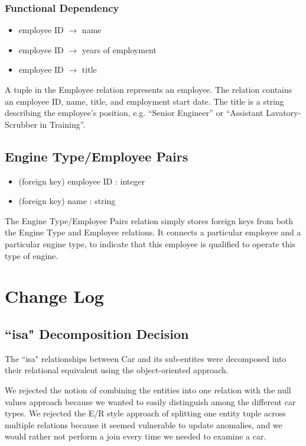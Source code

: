 \documentclass[a4paper]{article}
\begin{document}
\subsubsection*{Functional Dependency}
\begin{itemize}
\item employee ID  $\rightarrow$ name
\item employee ID  $\rightarrow$ years of employment
\item employee ID  $\rightarrow$ title
\end{itemize}
A tuple in the Employee relation represents an employee. The relation contains an employee ID, name, title, and employment start date. The title is a string describing the employee’s position, e.g. “Senior Engineer” or “Assistant Lavatory-Scrubber in Training”.

\subsection*{Engine Type/Employee Pairs}
\begin{itemize}
\item (foreign key) employee ID : integer
\item (foreign key) name : string
\end{itemize}
The Engine Type/Employee Pairs relation simply stores foreign keys from both the Engine Type and Employee relations. It connects a particular employee and a particular engine type, to indicate that this employee is qualified to operate this type of engine.


\section{Change Log}
\subsection*{``isa" Decomposition Decision}
The ``isa" relationships between Car and its sub-entites were decomposed into their relational equivalent using the object-oriented approach.

We rejected the notion of combining the entities into one relation with the null values approach because we wanted to easily distinguish among the different car types. We rejected the E/R style approach of splitting one entity tuple across multiple relations because it seemed vulnerable to update anomalies, and we would rather not perform a join every time we needed to examine a car.
\end{document}
